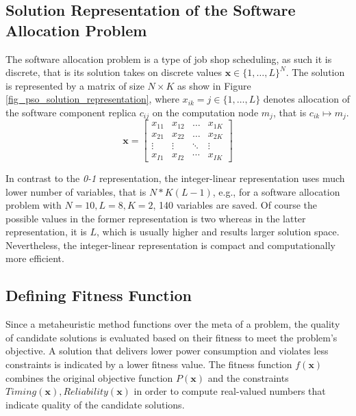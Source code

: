 \subsection{Solution Representation of the Software Allocation Problem}
The software allocation problem is a type of job shop scheduling, as such it is discrete, that is its solution takes on discrete values $\textbf{x}\in \{1,…,L\}^N$. The solution is represented by a matrix of size $N\times K$ as show in Figure \ref{fig_pso_solution_representation}, where $x_{ik}=j\in \{1,…,L\}$ denotes allocation of the software component replica $c_{ij}$ on the computation node $m_j$, that is $c_{ik}\mapsto m_j$.
\begin{equation}
\label{fig_pso_solution_representation}
\textbf{x}=
\begin{bmatrix} 
x_{11} & x_{12} & \dots & x_{1K}\\
x_{21} & x_{22} & \dots & x_{2K}\\
\vdots & \vdots & \ddots & \vdots\\
x_{I1} & x_{I2} & \cdots & x_{IK}
\end{bmatrix}
\end{equation}

In contrast to the \textit{0-1} representation, the integer-linear representation uses much lower number of variables, that is $N*K(L-1)$, e.g., for a software allocation problem with $N=10,L=8,K=2$, 140 variables are saved. Of course the possible values in the former representation is two whereas in the latter representation, it is $L$, which is usually higher and results larger solution space. Nevertheless, the integer-linear representation is compact and computationally more efficient.

\subsection{Defining Fitness Function}
Since a metaheuristic method functions over the meta of a problem, the quality of candidate solutions is evaluated based on their fitness to meet the problem's objective. A solution that delivers lower power consumption and violates less constraints is indicated by a lower fitness value. The fitness function $f(\textbf{x})$ combines the original objective function $P(\textbf{x})$ and the constraints $Timing(\textbf{x}),Reliability(\textbf{x})$ in order to compute real-valued numbers that indicate quality of the candidate solutions.

